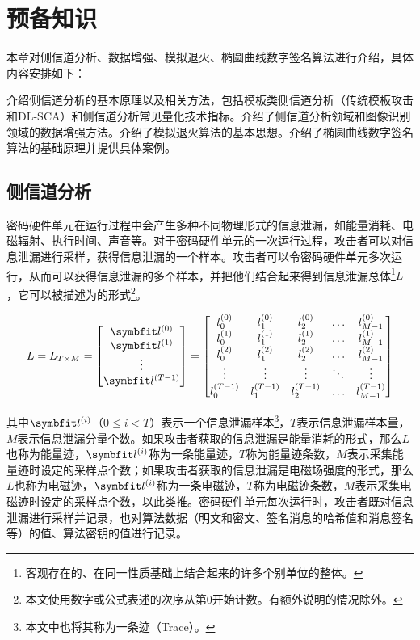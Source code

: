 \chapter{预备知识}\label{chap:preliminary}{
	本章对侧信道分析、数据增强、模拟退火、椭圆曲线数字签名算法进行介绍，具体内容安排如下：
	
	介绍侧信道分析的基本原理以及相关方法，包括模板类侧信道分析（传统模板攻击和DL-SCA）和侧信道分析常见量化技术指标。介绍了侧信道分析领域和图像识别领域的数据增强方法。介绍了模拟退火算法的基本思想。介绍了椭圆曲线数字签名算法的基础原理并提供具体案例。
	\section{侧信道分析}\label{sec:sca}
	密码硬件单元在运行过程中会产生多种不同物理形式的信息泄漏，如能量消耗、电磁辐射、执行时间、声音等。对于密码硬件单元的一次运行过程，攻击者可以对信息泄漏进行采样，获得信息泄漏的一个样本。攻击者可以令密码硬件单元多次运行，从而可以获得信息泄漏的多个样本，并把他们结合起来得到信息泄漏总体\footnote{客观存在的、在同一性质基础上结合起来的许多个别单位的整体。}$L$，它可以被描述为的形式\footnote{本文使用数字或公式表述的次序从第0开始计数。有额外说明的情况除外。}。
	
	\begin{equation}
	L=L_{T\times M}
	=\begin{bmatrix}
		\Vector {l}^{(0)}\\
		\Vector {l}^{(1)}\\
		\vdots\\
		\Vector {l}^{(T-1)}
	\end{bmatrix}
	=\begin{bmatrix}
		l^{(0)}_0&l^{(0)}_1&l^{(0)}_2&\ldots&l^{(0)}_{M-1}\\
		l^{(1)}_0&l^{(1)}_1&l^{(1)}_2&\ldots&l^{(1)}_{M-1}\\
		l^{(2)}_0&l^{(2)}_1&l^{(2)}_2&\ldots&l^{(2)}_{M-1}\\
		\vdots&\vdots&\vdots&\ddots&\vdots\\
		l^{(T-1)}_0&l^{(T-1)}_1&l^{(T-1)}_2&\ldots&l^{(T-1)}_{M-1}\\
	\end{bmatrix}\label{eq:trace}
	\end{equation}
	
	\noindent 其中$\Vector l^{(i)}$（$0\le i<T$）表示一个信息泄漏样本\footnote{本文中也将其称为一条迹（Trace）。}，$T$表示信息泄漏样本量，$M$表示信息泄漏分量个数。如果攻击者获取的信息泄漏是能量消耗的形式，那么$L$也称为能量迹，$\Vector l^{(i)}$称为一条能量迹，$T$称为能量迹条数，$M$表示采集能量迹时设定的采样点个数；如果攻击者获取的信息泄漏是电磁场强度的形式，那么$L$也称为电磁迹，$\Vector l^{(i)}$称为一条电磁迹，$T$称为电磁迹条数，$M$表示采集电磁迹时设定的采样点个数，以此类推。密码硬件单元每次运行时，攻击者既对信息泄漏进行采样并记录，也对算法数据（明文和密文、签名消息的哈希值和消息签名等）的值、算法密钥的值进行记录。%
	
}
